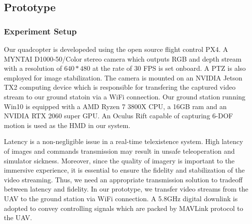 \documentclass[journal]{IEEEtran}
\begin{document}
\subsection{Prototype}
\label{sec:prototype}

\subsubsection{Experiment Setup}
Our quadcopter is developeded using the open source flight control PX4.
A MYNTAI D1000-50/Color stereo camera which outputs RGB and depth stream 
with a resolution of $640 * 480$ at the rate of 30 FPS is set onboard.
A PTZ is also employed for image stabilization. 
The camera is mounted on an NVIDIA Jetson TX2 computing device which is 
responsible for transfering the captured video stream to our ground statoin 
via a WiFi connection. Our ground station running Win10 is equipped with a
AMD Ryzen 7 3800X CPU, a 16GB ram and an NVIDIA RTX 2060 super GPU. 
An Oculus Rift capable of capturing 6-DOF motion is used as the HMD in our 
system.



Latency is a non-negligible issue in a real-time telexistence system. 
High latency of images and commands transmission may result in unsafe 
teleoperation and simulator sickness. Moreover, since the quality of imagery is 
important to the immersive experience, it is essential to ensure the fidelity 
and stabilization of the video streaming. 
Thus, we need an appropriate transmission 
solution to tradeoff between latency and fidelity.
In our prototype, we transfer video streams from the UAV to the ground station via WiFi 
connection. A 5.8GHz digital downlink is adopted to convey controlling signals which are 
packed by MAVLink protocol to the UAV. 
\end{document}
